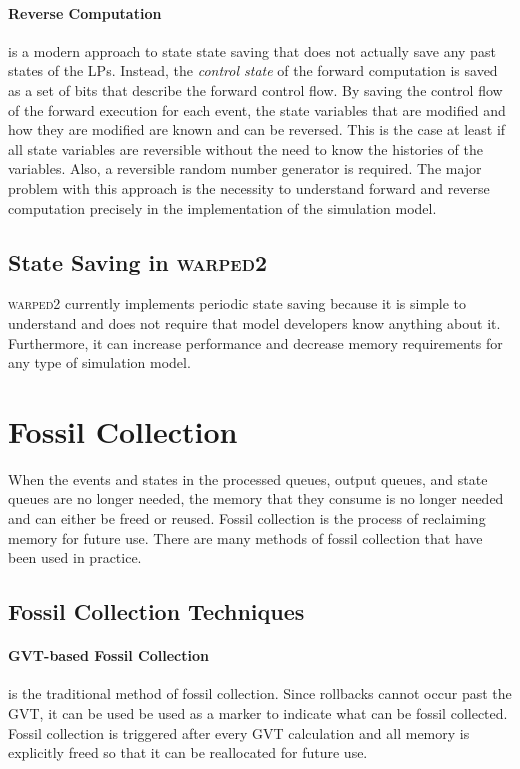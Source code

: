 \documentclass[11pt]{book}
\begin{document}
\paragraph{Reverse Computation} is a modern approach to state state saving that does not
actually save any past states of the LPs. Instead, the \emph{control state} of the forward
computation is saved as a set of bits that describe the forward control flow. By saving the control
flow of the forward execution for each event, the state variables that are modified and
how they are modified are known and can be reversed. This is the case at least if all state variables
are reversible without the need to know the histories of the variables. Also, a reversible
random number generator is required. The major problem with this approach is the necessity to
understand forward and reverse computation precisely in the implementation of the simulation model.

\subsection{State Saving in \textsc{warped2}}

\textsc{warped2} currently implements periodic state saving because it is simple to understand
and does not require that model developers know anything about it. Furthermore, it can increase
performance and decrease memory requirements for any type of simulation model. 

\section{Fossil Collection}

When the events and states in the processed queues, output queues, and state queues are
no longer needed, the memory that they consume is no longer needed and can either be freed
or reused. Fossil collection is the process of reclaiming memory for future use. There
are many methods of fossil collection that have been used in practice.

\subsection{Fossil Collection Techniques}

\paragraph{GVT-based Fossil Collection} is the traditional method of fossil collection.
Since rollbacks cannot occur past the GVT, it can be used be used as a marker to indicate
what can be fossil collected. Fossil collection is triggered after every GVT calculation
and all memory is explicitly freed so that it can be reallocated for future use.
\end{document}

